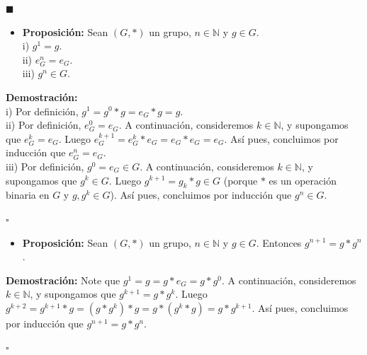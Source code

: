 \documentclass[10 pt]{article}
\begin{document}
\begin{flushright}
   $\blacksquare$
\end{flushright}

\begin{itemize}
    \item \Large{\textbf{Proposición:} Sean $(G,*)$ un grupo, $n \in \mathbb N$ y $g \in G$. \\

    i) $g^1=g$. \\

    ii) $e_G^n=e_G$. \\

    iii) $g^n \in G$.} \\
\end{itemize}

\Large{\textbf{Demostración:} \\

i) Por definición, $g^1=g^0*g=e_G*g=g$. \\

ii) Por definición, $e_G^0=e_G$. A continuación, consideremos $k \in \mathbb N$, y supongamos que $e_G^k=e_G$. Luego $e_G^{k+1}=e_G^k*e_G=e_G*e_G=e_G$. Así pues, concluimos por inducción que $e_G^n=e_G$. \\

iii) Por definición, $g^0=e_G \in G$. A continuación, consideremos $k \in \mathbb N$, y supongamos que $g^k \in G$. Luego $g^{k+1}=g_k*g \in G$ (porque $*$ es un operación binaria en $G$ y $g,g^k \in G$). Así pues, concluimos por inducción que $g^n \in G$.} \\ 

\begin{flushright}
    $\square$
\end{flushright}

\begin{itemize}
    \item \Large{\textbf{Proposición:} Sean $(G,*)$ un grupo, $n \in \mathbb N$ y $g \in G$. Entonces $g^{n+1}=g*g^n$.} \\
\end{itemize}

\Large{\textbf{Demostración:} Note que $g^1=g=g*e_G=g*g^0$. A continuación, consideremos $k \in \mathbb N$, y supongamos que $g^{k+1}=g*g^k$. Luego $g^{k+2}=g^{k+1}*g=(g*g^k)*g=g*(g^k*g)=g*g^{k+1}$. Así pues, concluimos por inducción que $g^{n+1}=g*g^n$.} \\

\begin{flushright}
    $\square$
\end{flushright}
\end{document}
